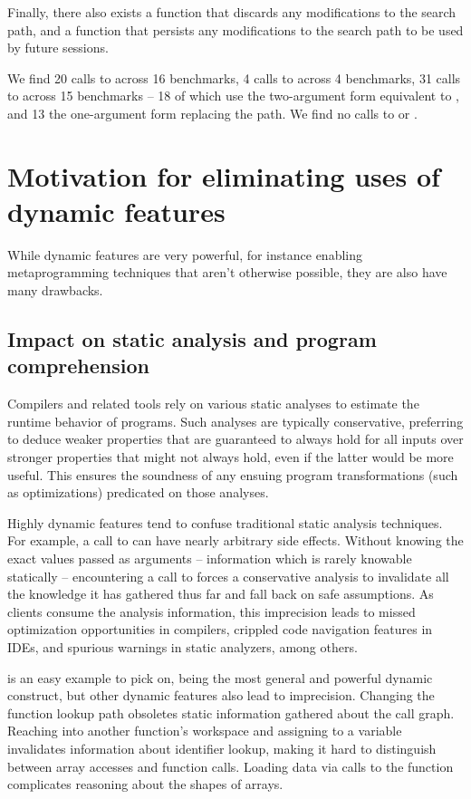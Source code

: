 Finally, there also exists a  function that discards
any modifications to the search path, and a  function that
persists any modifications to the search path to be used by future \matlab
sessions.

We find 20 calls to  across 16 benchmarks, 4 calls to
 across 4 benchmarks, 31 calls to  across 15 benchmarks
-- 18 of which use the two-argument form equivalent to , and 13
the one-argument form replacing the path. We find no calls to
 or .

\section{Motivation for eliminating uses of dynamic features}

While dynamic features are very powerful, for instance enabling metaprogramming
techniques that aren't otherwise possible, they are also have many drawbacks.

\subsection{Impact on static analysis and program comprehension}

Compilers and related tools rely on various static analyses to estimate the
runtime behavior of programs. Such analyses are typically conservative,
preferring to deduce weaker properties that are guaranteed to always hold for
all inputs over stronger properties that might not always hold, even if the
latter would be more useful. This ensures the soundness of any ensuing program
transformations (such as optimizations) predicated on those analyses.

Highly dynamic features tend to confuse traditional static analysis techniques.
For example, a call to  can have nearly arbitrary side effects.
Without knowing the exact values passed as arguments -- information which is
rarely knowable statically -- encountering a call to  forces a
conservative analysis to invalidate all the knowledge it has gathered thus far
and fall back on safe assumptions. As clients consume the analysis information,
this imprecision leads to missed optimization opportunities in compilers,
crippled code navigation features in IDEs, and spurious warnings in static
analyzers, among others.

 is an easy example to pick on, being the most general and powerful
dynamic construct, but other dynamic features also lead to imprecision.
Changing the function lookup path obsoletes static information gathered about
the call graph. Reaching into another function's workspace and assigning to a
variable invalidates information about identifier lookup, making it hard to
distinguish between array accesses and function calls. Loading data via calls
to the  function complicates reasoning about the shapes of arrays.

